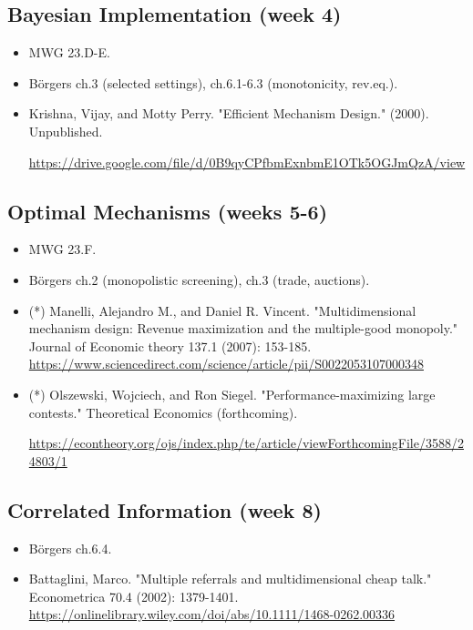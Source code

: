 \documentclass{article}
\begin{document}
\subsection{Bayesian Implementation (week 4)}
\begin{itemize}
	\item MWG 23.D-E.
	\item B{\"o}rgers ch.3 (selected settings), ch.6.1-6.3 (monotonicity, rev.eq.).
	\item Krishna, Vijay, and Motty Perry. "Efficient Mechanism Design." (2000). Unpublished.
	
	\url{https://drive.google.com/file/d/0B9qyCPfbmExnbmE1OTk5OGJmQzA/view}
\end{itemize}

\subsection{Optimal Mechanisms (weeks 5-6)}
\begin{itemize}
	\item MWG 23.F.
	\item B{\"o}rgers ch.2 (monopolistic screening), ch.3 (trade, auctions).
	\item (*) Manelli, Alejandro M., and Daniel R. Vincent. "Multidimensional mechanism design: Revenue maximization and the multiple-good monopoly." Journal of Economic theory 137.1 (2007): 153-185. \url{https://www.sciencedirect.com/science/article/pii/S0022053107000348}
	\item (*) Olszewski, Wojciech, and Ron Siegel. "Performance-maximizing large contests." Theoretical Economics (forthcoming).
	
	\url{https://econtheory.org/ojs/index.php/te/article/viewForthcomingFile/3588/24803/1}
\end{itemize}

\subsection{Correlated Information (week 8)}
\begin{itemize}
	\item B{\"o}rgers ch.6.4.
	\item Battaglini, Marco. "Multiple referrals and multidimensional cheap talk." Econometrica 70.4 (2002): 1379-1401. \url{https://onlinelibrary.wiley.com/doi/abs/10.1111/1468-0262.00336}
\end{itemize}
\end{document}
